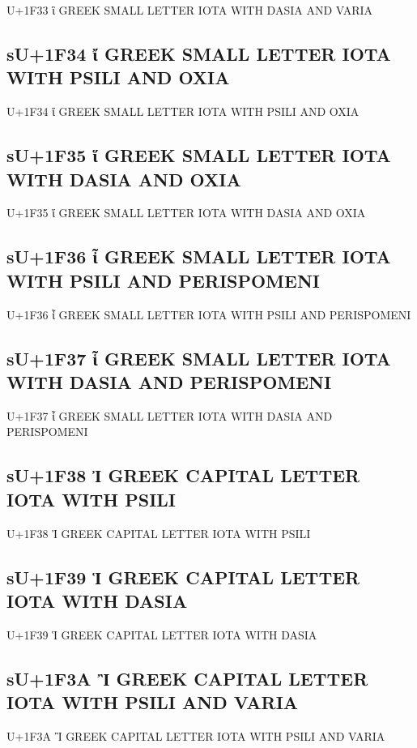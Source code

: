 U+1F33 ἳ GREEK SMALL LETTER IOTA WITH DASIA AND VARIA

\subsection{sU+1F34 ἴ GREEK SMALL LETTER IOTA WITH PSILI AND OXIA}

U+1F34 ἴ GREEK SMALL LETTER IOTA WITH PSILI AND OXIA

\subsection{sU+1F35 ἵ GREEK SMALL LETTER IOTA WITH DASIA AND OXIA}

U+1F35 ἵ GREEK SMALL LETTER IOTA WITH DASIA AND OXIA

\subsection{sU+1F36 ἶ GREEK SMALL LETTER IOTA WITH PSILI AND PERISPOMENI}

U+1F36 ἶ GREEK SMALL LETTER IOTA WITH PSILI AND PERISPOMENI

\subsection{sU+1F37 ἷ GREEK SMALL LETTER IOTA WITH DASIA AND PERISPOMENI}

U+1F37 ἷ GREEK SMALL LETTER IOTA WITH DASIA AND PERISPOMENI

\subsection{sU+1F38 Ἰ GREEK CAPITAL LETTER IOTA WITH PSILI}

U+1F38 Ἰ GREEK CAPITAL LETTER IOTA WITH PSILI

\subsection{sU+1F39 Ἱ GREEK CAPITAL LETTER IOTA WITH DASIA}

U+1F39 Ἱ GREEK CAPITAL LETTER IOTA WITH DASIA

\subsection{sU+1F3A Ἲ GREEK CAPITAL LETTER IOTA WITH PSILI AND VARIA}

U+1F3A Ἲ GREEK CAPITAL LETTER IOTA WITH PSILI AND VARIA

